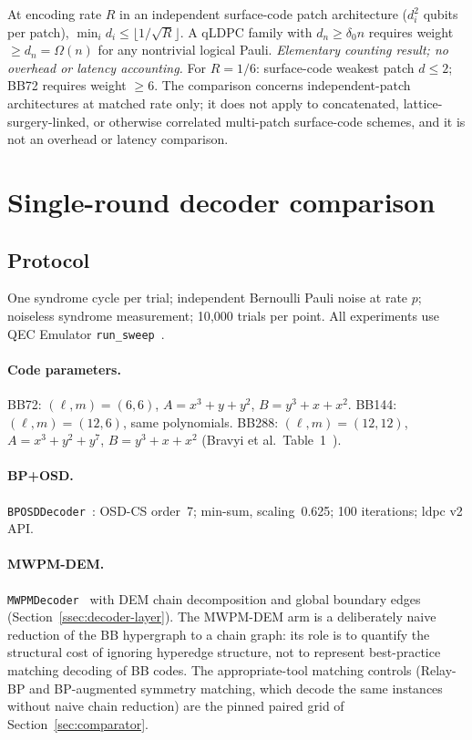 \documentclass[11pt,a4paper]{article}
\begin{document}
\begin{lemma}\label{lem:separation}
At encoding rate $R$ in an independent surface-code patch architecture
($d_i^2$ qubits per patch), $\min_i d_i\le\lfloor1/\!\sqrt{R}\rfloor$.
A qLDPC family with $d_n\ge\delta_0 n$ requires weight $\ge d_n=\Omega(n)$
for any nontrivial logical Pauli.
\emph{Elementary counting result; no overhead or latency accounting.}
For $R=1/6$: surface-code weakest patch $d\le2$; BB72 requires weight $\ge6$.
The comparison concerns independent-patch architectures at matched rate
only; it does not apply to concatenated, lattice-surgery-linked, or
otherwise correlated multi-patch surface-code schemes, and it is not an
overhead or latency comparison.
\end{lemma}

\section{Single-round decoder comparison}
\label{sec:benchmark}

\subsection{Protocol}

One syndrome cycle per trial; independent Bernoulli Pauli noise at rate $p$;
noiseless syndrome measurement; 10{,}000 trials per point.
All experiments use QEC Emulator
\texttt{run\_sweep}~\cite{AlDaajeh2026emulator}.

\paragraph{Code parameters.}
BB72: $(\ell,m)=(6,6)$, $A=x^3+y+y^2$, $B=y^3+x+x^2$.
BB144: $(\ell,m)=(12,6)$, same polynomials.
BB288: $(\ell,m)=(12,12)$, $A=x^3+y^2+y^7$, $B=y^3+x+x^2$
(Bravyi et al.\ Table~1~\cite{Bravyi2024}).

\paragraph{BP+OSD.}
\texttt{BPOSDDecoder}~\cite{AlDaajeh2026emulator,ldpcPackage}:
OSD-CS order~7; min-sum, scaling~0.625; 100 iterations; ldpc v2 API.

\paragraph{MWPM-DEM.}
\texttt{MWPMDecoder}~\cite{AlDaajeh2026emulator,Higgott2023}
with DEM chain decomposition and global boundary edges
(Section~\ref{ssec:decoder-layer}).
The MWPM-DEM arm is a deliberately naive reduction of the BB
hypergraph to a chain graph: its role is to quantify the structural
cost of ignoring hyperedge structure, not to represent best-practice
matching decoding of BB codes. The appropriate-tool matching controls
(Relay-BP and BP-augmented symmetry matching, which decode the same
instances without naive chain reduction) are the pinned paired grid of
Section~\ref{sec:comparator}.
\end{document}
